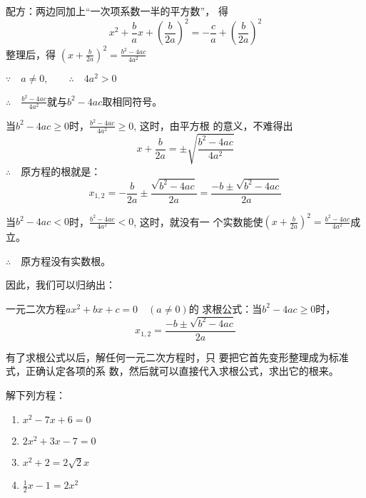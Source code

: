 配方：两边同加上“一次项系数一半的平方数”，
得
\[x^2+\frac{b}{a}x+\left(\frac{b}{2a}\right)^2=-\frac{c}{a}+\left(\frac{b}{2a}\right)^2\]
整理后，得 $\left(x+\frac{b}{2a}\right)^2=\frac{b^2-4ac}{4a^2}$

$\because\quad a\ne 0, \qquad \therefore\quad 4a^2>0$

$\therefore\quad \frac{b^2-4ac}{4a^2}$就与$b^2-4ac$取相同符号。

当$b^2-4ac\ge 0$时，$\frac{b^2-4ac}{4a^2}\ge 0$, 这时，由平方根
的意义，不难得出
\[x+\frac{b}{2a}=\pm\sqrt{\frac{b^2-4ac}{4a^2}}\]
$\therefore\quad $原方程的根就是：
\[x_{1,2}=-\frac{b}{2a}\pm \frac{\sqrt{b^2-4ac}}{2a}=\frac{-b\pm \sqrt{b^2-4ac}}{2a} \]

当$b^2-4ac<0$时，$\frac{b^2-4ac}{4a^2}<0$, 这时，就没有一
个实数能使$\left(x+\frac{b}{2a}\right)^2=\frac{b^2-4ac}{4a^2}$成立。

$\therefore\quad $原方程没有实数根。

因此，我们可以归纳出：
\begin{blk}{}
    一元二次方程$ax^2+bx+c=0\quad (a\ne 0)$的
    求根公式：当$b^2-4ac\ge 0$时，
\[x_{1,2}=\frac{-b\pm\sqrt{b^2-4ac}}{2a} \]
\end{blk}

有了求根公式以后，解任何一元二次方程时，只
要把它首先变形整理成为标准式，正确认定各项的系
数，然后就可以直接代入求根公式，求出它的根来。

\begin{example}
    解下列方程：
    \begin{multicols}{2}
\begin{enumerate}
    \item $x^2-7x+6=0$
    \item $2x^2+3x-7=0$
    \item $x^2+2=2\sqrt{2}x$
    \item $\frac{1}{2}x-1=2x^2$
\end{enumerate}
    \end{multicols}
\end{example}

